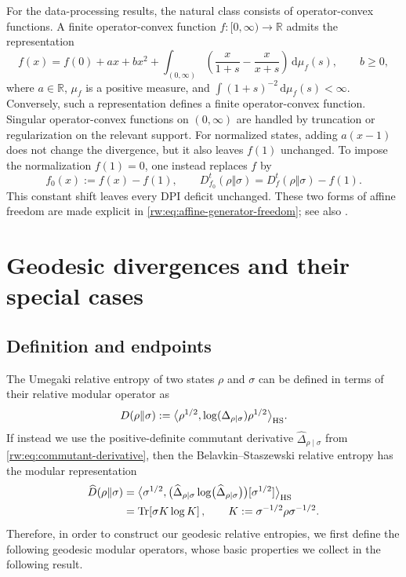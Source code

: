 \documentclass[11pt]{article}
\theoremstyle{remark}
\newcommand{\1}{\mathbbm{1}}
\begin{document}
For the data-processing results, the natural class consists of
operator-convex functions.  A finite operator-convex function
$f:[0,\infty)\to\mathbb R$ admits the representation
\cite[Theorem~8.1]{hiai2011quantum}
\begin{equation}
 f(x)=f(0)+ax+bx^2
 +\int_{(0,\infty)}\left(
    \frac{x}{1+s}-\frac{x}{x+s}\right)\,\mathrm d\mu_f(s),
 \qquad b\geq0,
 \label{rw:eq:operator-convex-representation}
\end{equation}
where $a\in\mathbb R$, $\mu_f$ is a positive measure, and
$\int(1+s)^{-2}\,\mathrm d\mu_f(s)<\infty$.  Conversely, such a
representation defines a finite operator-convex function.  Singular
operator-convex functions on $(0,\infty)$ are handled by truncation
or regularization on the relevant support.  For normalized states,
adding $a(x-1)$ does not change the divergence, but it also leaves
$f(1)$ unchanged.  To impose the normalization $f(1)=0$, one instead
replaces $f$ by
\begin{equation*}
 f_0(x):=f(x)-f(1),
 \qquad
 D_{f_0}^t(\rho\Vert\sigma)
 =D_f^t(\rho\Vert\sigma)-f(1).
\end{equation*}
This constant shift leaves every DPI deficit unchanged.  These two
forms of affine freedom are made explicit in
\eqref{rw:eq:affine-generator-freedom}; see also
\cite{hiai2011quantum,hiai2017different}.

\section{Geodesic divergences and their special cases}
\label{rw:sec:interpolated-divergences}

\subsection{Definition and endpoints}
\label{rw:subsec:definition-interpolation}

The Umegaki relative entropy of two states $\rho$ and $\sigma$ can be defined in terms of their relative modular operator as 
\begin{equation}
    D(\rho \| \sigma):= \big\langle\rho^{1/2},
 \log(\Delta_{\rho\mid\sigma})\rho^{1/2}
 \big\rangle_{\rm HS}.
\end{equation}
If instead we use the positive-definite commutant derivative
$\widehat\Delta_{\rho\mid\sigma}$ from
\eqref{rw:eq:commutant-derivative}, then the
Belavkin--Staszewski relative entropy has the modular representation
\begin{equation}
 \begin{aligned}
 \widehat D(\rho\Vert\sigma)
 &=
 \big\langle\sigma^{1/2},
 \bigl(\widehat\Delta_{\rho\mid\sigma}
 \log\bigl(\widehat\Delta_{\rho\mid\sigma}\bigr)\bigr)
 [\sigma^{1/2}]\big\rangle_{\rm HS}\\
 &=\operatorname{Tr}\!\left[
 \sigma K\log K\right],
 \qquad K:=\sigma^{-1/2}\rho\sigma^{-1/2}.
 \end{aligned}
\end{equation}
Therefore, in order to construct our geodesic relative entropies, we first define the following geodesic modular operators, whose basic properties we collect in the following result.
\end{document}
